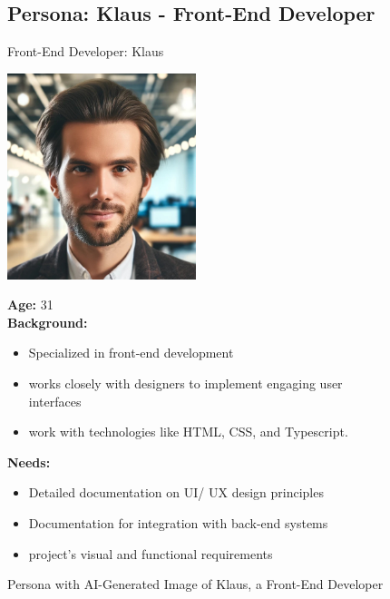 \pagebreak

\begin{figure}[h!]
\subsection*{Persona: Klaus - Front-End Developer}
\begin{persona}{Front-End Developer: Klaus}
\begin{tcbraster}[raster columns=2, raster column skip=5mm]
  \begin{tcolorbox}[width=0.2\linewidth, colback=white, colframe=white, boxrule=0pt, halign=center]
   \includegraphics[width=\linewidth, height=6cm, keepaspectratio]{Images/Klaus.jpg}
  \end{tcolorbox}
  \begin{tcolorbox}[width=0.8\linewidth, colback=white, colframe=white, boxrule=0pt]
  \fontsize{10pt}{9.6pt}\selectfont
    \textbf{Age:} 31\\
            \textbf{Background:} 
    \begin{itemize}
        \item Specialized in front-end development
        \item works closely with designers to implement engaging user interfaces
        \item work with technologies like HTML, CSS, and Typescript.
    \end{itemize}
    \textbf{Needs:}
        \begin{itemize}
        \item Detailed documentation on \ac{UI}/ \ac{UX} design principles
        \item Documentation for integration with back-end systems
        \item project's visual and functional requirements
    \end{itemize}
  \end{tcolorbox}
\end{tcbraster}
\end{persona}
\caption{Persona with \ac{AI}-Generated Image of Klaus, a Front-End Developer}
\label{fig:persona:klaus}
\end{figure}

